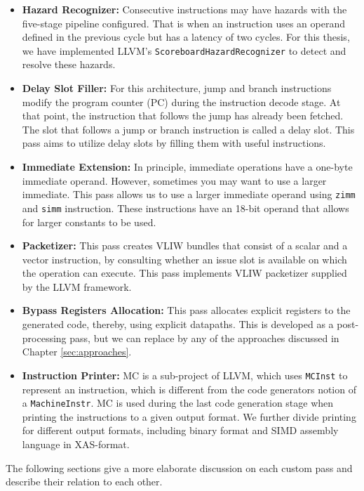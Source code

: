 \begin{itemize}
	\item \textbf{Hazard Recognizer:} Consecutive instructions may have hazards with the five-stage pipeline configured. That is when an instruction uses an operand defined in the previous cycle but has a latency of two cycles. For this thesis, we have implemented LLVM's \texttt{ScoreboardHazardRecognizer} to detect and resolve these hazards.
	\item \textbf{Delay Slot Filler:} For this architecture, jump and branch instructions modify the program counter (PC) during the instruction decode stage. At that point, the instruction that follows the jump has already been fetched. The slot that follows a jump or branch instruction is called a delay slot. This pass aims to utilize delay slots by filling them with useful instructions.%
	\item \textbf{Immediate Extension:} In principle, immediate operations have a one-byte immediate operand. However, sometimes you may want to use a larger immediate. This pass allows us to use a larger immediate operand using \texttt{zimm} and \texttt{simm} instruction. These instructions have an 18-bit operand that allows for larger constants to be used.%
	\item \textbf{Packetizer:} This pass creates VLIW bundles that consist of a scalar and a vector instruction, by consulting whether an issue slot is available on which the operation can execute. This pass implements VLIW packetizer supplied by the LLVM framework.
	\item \textbf{Bypass Registers Allocation:} This pass allocates explicit registers to the generated code, thereby, using explicit datapaths. This is developed as a post-processing pass, but we can replace by any of the approaches discussed in Chapter \ref{sec:approaches}.
	\item \textbf{Instruction Printer:} MC is a sub-project of LLVM, which uses \texttt{MCInst} to represent an instruction, which is different from the code generators notion of a \texttt{MachineInstr}. MC is used during the last code generation stage when printing the instructions to a given output format. We further divide printing for different output formats, including binary format and SIMD assembly language in XAS-format. 


\end{itemize}
The following sections give a more elaborate discussion on each custom pass and describe their relation to each other.

